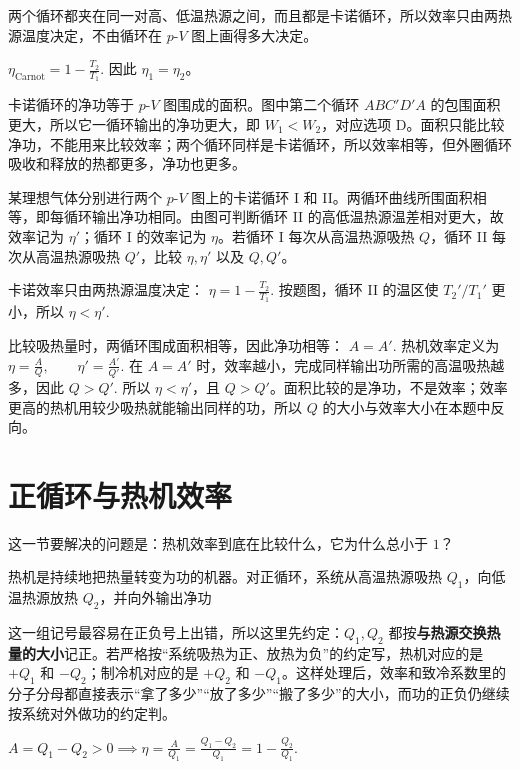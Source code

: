 \documentclass[lang=cn,11pt]{elegantbook}
\newcommand{\bridge}[1]{\begin{note}#1\end{note}}
\begin{document}
\begin{solution}
两个循环都夹在同一对高、低温热源之间，而且都是卡诺循环，所以效率只由两热源温度决定，不由循环在 \(p\)-\(V\) 图上画得多大决定。

 \(\eta_{\text{Carnot}}=1-\frac{T_2}{T_1}.\) 
因此 \(\eta_1=\eta_2\)。

卡诺循环的净功等于 \(p\)-\(V\) 图围成的面积。图中第二个循环 \(ABC'D'A\) 的包围面积更大，所以它一循环输出的净功更大，即 \(W_1<W_2\)，对应选项 D。面积只能比较净功，不能用来比较效率；两个循环同样是卡诺循环，所以效率相等，但外圈循环吸收和释放的热都更多，净功也更多。
\end{solution}

\begin{exercise}
某理想气体分别进行两个 \(p\)-\(V\) 图上的卡诺循环 I 和 II。两循环曲线所围面积相等，即每循环输出净功相同。由图可判断循环 II 的高低温热源温差相对更大，故效率记为 \(\eta'\)；循环 I 的效率记为 \(\eta\)。若循环 I 每次从高温热源吸热 \(Q\)，循环 II 每次从高温热源吸热 \(Q'\)，比较 \(\eta,\eta'\) 以及 \(Q,Q'\)。
\end{exercise}

\begin{solution}
卡诺效率只由两热源温度决定：
 \(\eta=1-\frac{T_2}{T_1}.\) 
按题图，循环 II 的温区使 \(T_2'/T_1'\) 更小，所以
 \(\eta<\eta'.\) 

比较吸热量时，两循环围成面积相等，因此净功相等：
 \(A=A'.\) 
热机效率定义为
 \(\eta=\frac{A}{Q},\qquad \eta'=\frac{A'}{Q'}.\) 
在 \(A=A'\) 时，效率越小，完成同样输出功所需的高温吸热越多，因此
 \(Q>Q'.\) 
所以 \(\eta<\eta'\)，且 \(Q>Q'\)。面积比较的是净功，不是效率；效率更高的热机用较少吸热就能输出同样的功，所以 \(Q\) 的大小与效率大小在本题中反向。
\end{solution}

\section{正循环与热机效率}

这一节要解决的问题是：热机效率到底在比较什么，它为什么总小于 \(1\)？

热机是持续地把热量转变为功的机器。对正循环，系统从高温热源吸热 \(Q_1\)，向低温热源放热 \(Q_2\)，并向外输出净功
\bridge{这一组记号最容易在正负号上出错，所以这里先约定：\(Q_1,Q_2\) 都按\textbf{与热源交换热量的大小}记正。若严格按“系统吸热为正、放热为负”的约定写，热机对应的是 \(+Q_1\) 和 \(-Q_2\)；制冷机对应的是 \(+Q_2\) 和 \(-Q_1\)。这样处理后，效率和致冷系数里的分子分母都直接表示“拿了多少”“放了多少”“搬了多少”的大小，而功的正负仍继续按系统对外做功的约定判。}
 \(A=Q_1-Q_2>0 \implies \eta=\frac{A}{Q_1}=\frac{Q_1-Q_2}{Q_1}=1-\frac{Q_2}{Q_1}.\) 
\end{document}
